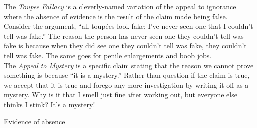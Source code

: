 \documentclass[a4paper,12pt,single,pdftex]{scrartcl}
\begin{document}
{    
      The {\em Toupee Fallacy} is a cleverly-named variation of the appeal to ignorance where the absence of evidence is the result of the claim made being false. Consider the argument, “all toupées look fake; I've never seen one that I couldn't tell was fake.” The reason the person has never seen one they couldn’t tell was fake is because when they did see one they couldn’t tell was fake, they couldn’t tell was fake. The same goes for penile enlargements and boob jobs.
    \\

    
      The {\em Appeal to Mystery} is a specific claim stating that the reason we cannot prove something is because “it is a mystery.” Rather than question if the claim is true, we accept that it is true and forego any more investigation by writing it off as a mystery. Why is it that I smell just fine after working out, but everyone else thinks I stink? It’s a mystery!
    \\

  }


Evidence of absence
\end{document}
